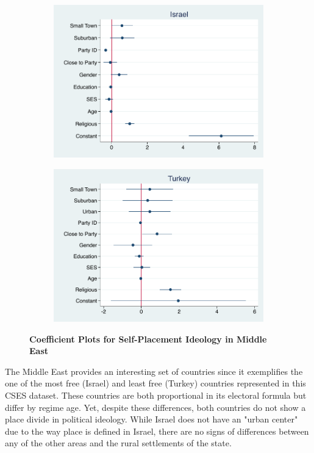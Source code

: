 \documentclass[12pt, titlepage]{article}
\newcommand\tb{\textbf}
\begin{document}
\begin{figure}[H]
	\centering
	\begin{subfigure}[b]{0.475\textwidth}
		\centering
		\includegraphics[width=\textwidth]{IdeologyCoef/Israel}
	\end{subfigure}
	\hfill
	\begin{subfigure}[b]{0.475\textwidth}  
		\centering 
		\includegraphics[width=\textwidth]{IdeologyCoef/Turkey}
	\end{subfigure}
	\caption[ \tb{Self-Placement Ideology - Middle East} ]
	{\tb {Coefficient Plots for Self-Placement Ideology in Middle East} }
	\label{MidEast}
\end{figure}

The Middle East provides an interesting set of countries since it exemplifies the one of the most free (Israel) and least free (Turkey) countries represented in this CSES dataset. These countries are both proportional in its electoral formula but differ by regime age. Yet, despite these differences, both countries do not show a place divide in political ideology. While Israel does not have an "urban center" due to the way place is defined in Israel, there are no signs of differences between any of the other areas and the rural settlements of the state.
\end{document}
